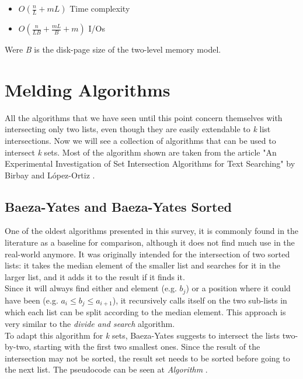 \begin{itemize}
    \item $O \left( \frac{n}{L} +mL \right)$ Time complexity
    \item $O \left( \frac{n}{LB} + \frac{mL}{B} +m \right)$ I/Os 
\end{itemize}

Were \textit{B} is the disk-page size of the two-level memory model.

\section{Melding Algorithms}

All the algorithms that we have seen until this point concern themselves with intersecting only two lists, even though they are easily extendable to \textit{k} list intersections. Now we will see a collection of algorithms that can be used to intersect \textit{k} sets. Most of the algorithm shown are taken from the article "An Experimental Investigation of Set Intersection Algorithms for Text Searching" by Birbay and López-Ortiz \citep{birbay_ortiz}.\\

\subsection{Baeza-Yates and Baeza-Yates Sorted}

One of the oldest algorithms presented in this survey, it is commonly found in the literature as a baseline for comparison, although it does not find much use in the real-world anymore. It was originally intended for the intersection of two sorted lists: it takes the median element of the smaller list and searches for it in the larger list, and it adds it to the result if it finds it.\\   
Since it will always find either and element (e.g. $b_j$) or a position where it could have been (e.g. $a_i \leq b_j \leq a_{i+1}$), it recursively calls itself on the two sub-lists in which each list can be split according to the median element. This approach is very similar to the \textit{divide and search}  algorithm.\\
To adapt this algorithm for \textit{k} sets, Baeza-Yates suggests to intersect the lists two-by-two, starting with the first two smallest ones. Since the result of the intersection may not be sorted, the result set needs to be sorted before going to the next list. The pseudocode can be seen at \textit{Algorithm} .

